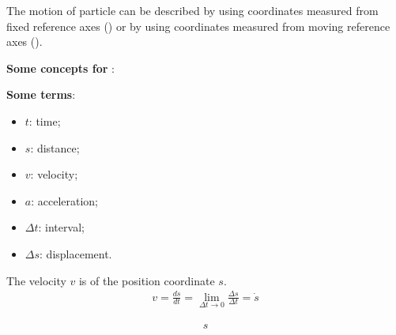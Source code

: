 The motion of particle can be described by using coordinates measured from fixed
reference axes () or by using coordinates 
measured from moving reference axes ().

\textbf{Some concepts for} :

\textbf{Some terms}:
\begin{itemize}
  \item $t$: time;
  \item $s$: distance;
  \item $v$: velocity;
  \item $a$: acceleration;
  \item $\Delta{t}$: interval;
  \item $\Delta{s}$: displacement.
\end{itemize}

The velocity $v$ is  of the position coordinate $s$.
\begin{align}
  v = \frac{ds}{dt} = \lim_{\Delta{t} \to 0}\frac{\Delta{s}}{\Delta{t}} = \dot{s}
  \label{eq:velocity-displacement}
\end{align}

\begin{align}
 s 
\end{align}

